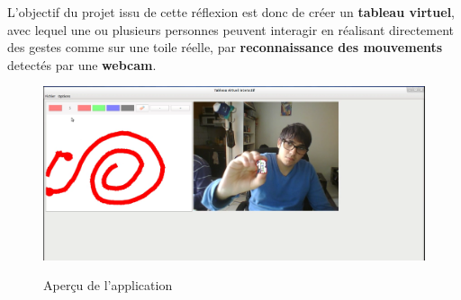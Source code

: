 \documentclass{report}
\begin{document}
		 L'objectif du projet issu de cette réflexion est donc de créer un \textbf{tableau virtuel}, avec lequel une ou plusieurs personnes peuvent interagir en réalisant directement des gestes comme sur une toile réelle, par \textbf{reconnaissance des mouvements} detectés par une \textbf{webcam}. \\
		\begin{figure}[!h]
			\centering
			\includegraphics[scale=0.3]{../images/capture-intro.png}\\
			\caption{Aperçu de l'application}
			\label{Aperçu de l'application}
		\end{figure}
	\newpage
\end{document}
